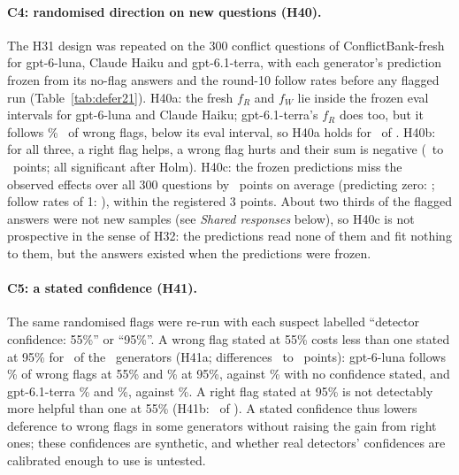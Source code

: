 
\paragraph{C4: randomised direction on new questions (H40).} The H31 design was repeated on the 300 conflict questions
of ConflictBank-fresh for gpt-6-luna, Claude Haiku and gpt-6.1-terra, with each generator's prediction frozen from
its no-flag answers and the round-10 follow rates before any flagged run (Table~\ref{tab:defer21}). H40a: the fresh
$f_R$ and $f_W$ lie inside the frozen eval intervals for gpt-6-luna and Claude Haiku; gpt-6.1-terra's $f_R$ does too,
but it follows \cxFrTerraFolW\% \cxFrTerraFolWCI\ of wrong flags, below its eval interval, so H40a holds for
\cxFrHoldN\ of \cxFrN. H40b: for all three, a right flag helps, a wrong flag hurts and their sum is negative
(\cxFrHaikuSum\ to \cxFrTerraSum\ points; all significant after Holm). H40c: the frozen predictions miss the observed
effects over all 300 questions by \cxFrMae\ points on average (predicting zero: \cxFrMaeZero; follow rates of 1:
\cxFrMaeOnes), within the registered 3 points. About two thirds of the flagged answers were not new samples (see
\emph{Shared responses} below), so H40c is not prospective in the sense of H32: the predictions read none of them and
fit nothing to them, but the answers existed when the predictions were frozen.

\paragraph{C5: a stated confidence (H41).} The same randomised flags were re-run with each suspect labelled ``detector
confidence: 55\%'' or ``95\%''. A wrong flag stated at 55\% costs less than one stated at 95\% for \cxCfWSigN\ of the
\cxCfN\ generators (H41a; differences \cxCfWDiffMin\ to \cxCfWDiffMax\ points): gpt-6-luna follows \cxCfLunaFolWLow\% of
wrong flags at 55\% and \cxCfLunaFolWHigh\% at 95\%, against \rfolWrongLuna\% with no confidence stated, and
gpt-6.1-terra \cxCfTerraFolWLow\% and \cxCfTerraFolWHigh\%, against \rfolWrongTerra\%. A right flag stated at 95\%
is not detectably more helpful than one at 55\% (H41b: \cxCfRSigN\ of \cxCfN). A stated confidence thus lowers
deference to wrong flags in some generators without raising the gain from right ones; these confidences are
synthetic, and whether real detectors' confidences are calibrated enough to use is untested.


